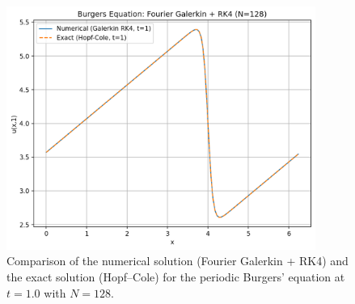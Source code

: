 \documentclass{article}
\begin{document}
\begin{figure}[htbp]
    \centering
    \includegraphics[width=0.9\textwidth]{figure/burgers_galerkin_solution.png}
    \caption{Comparison of the numerical solution (Fourier Galerkin + RK4) and the exact solution (Hopf--Cole) for the periodic Burgers' equation at $t=1.0$ with $N=128$.}
    \label{fig:burgers_galerkin_solution}
\end{figure}
\end{document}
